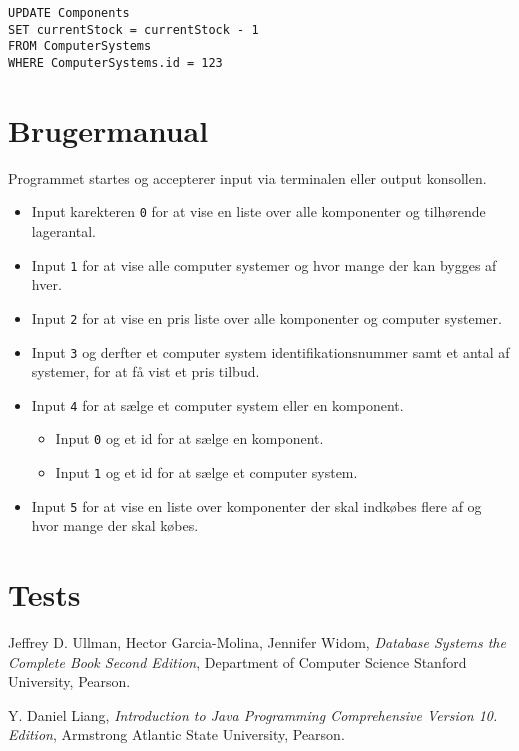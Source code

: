\documentclass[a4paper]{article}
\begin{document}
\begin{lstlisting}[caption=Salg af et computer system]
UPDATE Components
SET currentStock = currentStock - 1
FROM ComputerSystems
WHERE ComputerSystems.id = 123
\end{lstlisting}

\section{Brugermanual}
Programmet startes og accepterer input via terminalen eller output konsollen.
\begin{itemize}
    \item Input karekteren \texttt{0} for at vise en liste over alle komponenter og tilhørende lagerantal.
    \item Input \texttt{1} for at vise alle computer systemer og hvor mange der kan bygges af hver.
    \item Input \texttt{2} for at vise en pris liste over alle komponenter og computer systemer.
    \item Input \texttt{3} og derfter et computer system identifikationsnummer samt et antal af systemer, for at få vist et pris tilbud.
    \item Input \texttt{4} for at sælge et computer system eller en komponent.

        \begin{itemize}
            \item Input \texttt{0} og et id for at sælge en komponent.
            \item Input \texttt{1} og et id for at sælge et computer system.
        \end{itemize}

    \item Input \texttt{5} for at vise en liste over komponenter der skal indkøbes flere af og hvor mange der skal købes.
\end{itemize}

\section{Tests}

\begin{thebibliography}{9}

    Jeffrey D. Ullman, Hector Garcia-Molina, Jennifer Widom,
    \emph{Database Systems the Complete Book Second Edition},
    Department of Computer Science Stanford University,
    Pearson.

    Y. Daniel Liang,
    \emph{Introduction to Java Programming Comprehensive Version 10. Edition},
    Armstrong Atlantic State University,
    Pearson.

\end{thebibliography}
\end{document}
